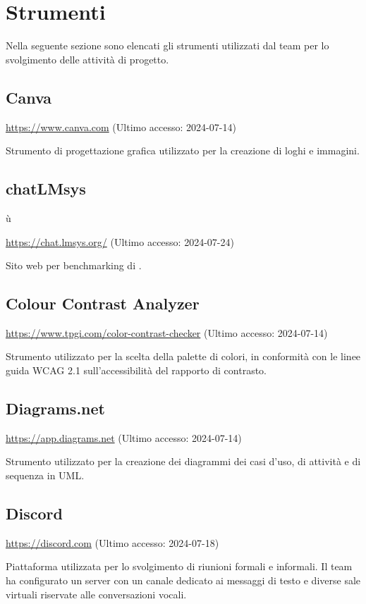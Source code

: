 \section{Strumenti}\label{strumenti}
\par Nella seguente sezione sono elencati gli strumenti utilizzati dal team per lo svolgimento delle attività di progetto.

\subsection{Canva}
\par \href{https://www.canva.com}{https://www.canva.com} (Ultimo accesso: 2024-07-14)
\par Strumento di progettazione grafica utilizzato per la creazione di loghi e immagini.

\subsection{chatLMsys}ù
\par \href{https://chat.lmsys.org/}{https://chat.lmsys.org/} (Ultimo accesso: 2024-07-24)
\par Sito web per benchmarking di .

\subsection{Colour Contrast Analyzer}
\par \href{https://www.tpgi.com/color-contrast-checker}{https://www.tpgi.com/color-contrast-checker} (Ultimo accesso: 2024-07-14)
\par Strumento utilizzato per la scelta della palette di colori, in conformità con le linee guida WCAG 2.1 sull'accessibilità del rapporto di contrasto.

\subsection{Diagrams.net}
\par \href{https://app.diagrams.net}{https://app.diagrams.net} (Ultimo accesso: 2024-07-14)
\par Strumento utilizzato per la creazione dei diagrammi dei casi d'uso, di attività e di sequenza in UML.

\subsection{Discord}
\par \href{https://discord.com}{https://discord.com} (Ultimo accesso: 2024-07-18)
\par Piattaforma utilizzata per lo svolgimento di riunioni formali e informali. Il team ha configurato un server con un canale dedicato ai messaggi di testo e diverse sale virtuali riservate alle conversazioni vocali.
    
